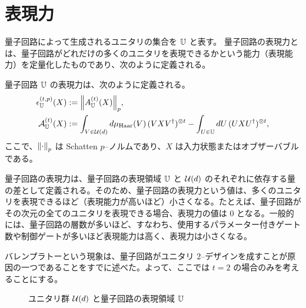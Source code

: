 \section{表現力}\label{sec:expressibility}
量子回路によって生成されるユニタリの集合を $\mathbb{U}$ と表す。
量子回路の表現力とは、量子回路がどれだけの多くのユニタリを表現できるかという能力（表現能力）を定量化したものであり、次のように定義される。
\begin{screen}
    \begin{definition}\label{def:expressibility}
        量子回路 $\mathbb{U}$ の表現力は、次のように定義される。
        \begin{align}
            \epsilon_{\mathbb{U}}^{(t,p)}(X) &:= \norm{A_{\mathbb{U}}^{(t)}(X)}_p,\\
            \mathcal{A}_{\mathbb{U}}^{(t)}(X) &:= \int_{V\in\mathcal{U}(d)} d\mu_{\mathrm{Haar}}(V)\,(VXV^\dagger)^{\otimes {t}} - \int_{U\in\mathbb{U}} dU\,(UXU^\dagger)^{\otimes {t}},
        \end{align}
        ここで、$\norm{\cdot}_p$ は Schatten $p$--ノルムであり、$X$ は入力状態またはオブザーバブルである。
    \end{definition}
\end{screen}
量子回路の表現力は、量子回路の表現領域 $\mathbb{U}$ と $\mathcal{U}(d)$ のそれぞれに依存する量の差として定義される。そのため、量子回路の表現力という値は、多くのユニタリを表現できるほど（表現能力が高いほど）小さくなる。たとえば、量子回路がその次元の全てのユニタリを表現できる場合、表現力の値は $0$ となる。一般的には、量子回路の層数が多いほど、すなわち、使用するパラメーター付きゲート数や制御ゲートが多いほど表現能力は高く、表現力は小さくなる。

バレンプラトーという現象は、量子回路がユニタリ $2$--デザインを成すことが原因の一つであることをすでに述べた。よって、ここでは $t=2$ の場合のみを考えることにする。

\begin{figure}[H]
    \centering
    \caption{ユニタリ群 $\mathcal{U}(d)$ と量子回路の表現領域 $\mathbb{U}$}
    \label{fig:expressibility}
\end{figure}


